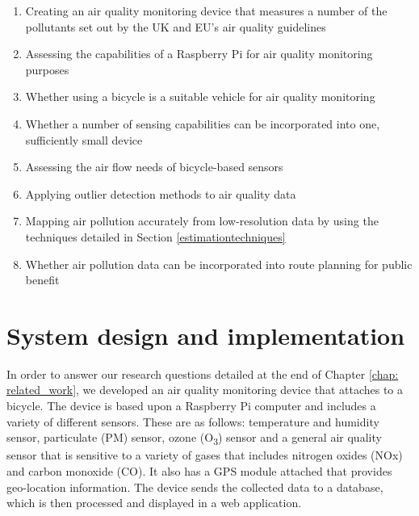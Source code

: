 \documentclass[11pt]{report}
\begin{document}
\begin{enumerate}
\item Creating an air quality monitoring device that measures a number of the pollutants set out by the UK and EU's air quality guidelines
\item Assessing the capabilities of a Raspberry Pi for air quality monitoring purposes
\item Whether using a bicycle is a suitable vehicle for air quality monitoring
\item Whether a number of sensing capabilities can be incorporated into one, sufficiently small device
\item Assessing the air flow needs of bicycle-based sensors
\item Applying outlier detection methods to air quality data %
\item Mapping air pollution accurately from low-resolution data by using the techniques detailed in Section \ref{estimationtechniques}
\item Whether air pollution data can be incorporated into route planning for public benefit
\end{enumerate}



\chapter{System design and implementation} \label{chap: system_design}

In order to answer our research questions detailed at the end of Chapter \ref{chap: related_work}, we developed an air quality monitoring device that attaches to a bicycle. The device is based upon a Raspberry Pi computer and includes a variety of different sensors. These are as follows: temperature and humidity sensor, particulate (PM) sensor, ozone (O\textsubscript{3}) sensor and a general air quality sensor that is sensitive to a variety of gases that includes nitrogen oxides (NOx) and carbon monoxide (CO). It also has a GPS module attached that provides geo-location information. The device sends the collected data to a database, which is then processed and displayed in a web application. 
\end{document}
